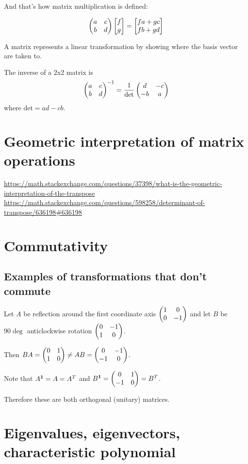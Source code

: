 And that's how matrix multiplication is defined:

$$
\begin{pmatrix}a & c\\b & d\\ \end{pmatrix} \begin{bmatrix}f\\g\end{bmatrix} = \begin{bmatrix}fa + gc\\fb + gd\end{bmatrix}
$$


A matrix represents a linear transformation by showing where the basis vector
are taken to.

\begin{theorem}
  The inverse of a 2x2 matrix is
  \begin{align*}
   \begin{pmatrix}a & c\\b & d\\ \end{pmatrix}^{-1}
  =
  \frac{1}{\text{det}} \begin{pmatrix}d  & -c\\-b & a\\ \end{pmatrix}
  \end{align*}
  where $\text{det} = ad - cb$.
\end{theorem}

\section{Geometric interpretation of matrix operations}
\url{https://math.stackexchange.com/questions/37398/what-is-the-geometric-interpretation-of-the-transpose}
\url{https://math.stackexchange.com/questions/598258/determinant-of-transpose/636198#636198}


\section{Commutativity}
\subsection{Examples of transformations that don't commute}
Let $A$ be reflection around the first coordinate axis $\begin{pmatrix}1 & 0\\0 & -1\\ \end{pmatrix}$
and let $B$ be $90\deg$ anticlockwise rotation $\begin{pmatrix}0 & -1\\1 & 0\\ \end{pmatrix}$.

Then $BA = \begin{pmatrix}0 & 1\\1 & 0\\ \end{pmatrix}
\neq  AB = \begin{pmatrix}0 & -1\\-1 & 0\\ \end{pmatrix}$.

Note that $A^{\mathbf 1} = A = A^T$ and $B^{\mathbf 1} = \begin{pmatrix}0 & 1\\-1 & 0\\ \end{pmatrix} = B^T$.

Therefore these are both orthogonal (unitary) matrices.


\section{Eigenvalues, eigenvectors, characteristic polynomial}

